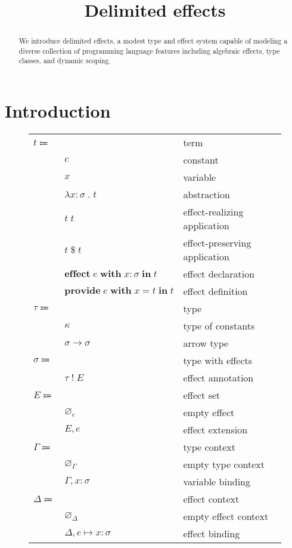 \documentclass[12pt]{article}
\title{Delimited effects}
\date{}
\newcommand\eterm{t}
\newcommand\econst{c}
\newcommand\evar{x}
\newcommand\eabs[2]{\lambda #1 \; . \; #2} %
\newcommand\eapp[2]{#1 \; #2}
\newcommand\eappx[2]{#1 \; \$ \; #2}
\newcommand\eeffect[4]{\textbf{effect} \; #1 \; \textbf{with} \; \tanno{#2}{#3} \; \textbf{in} \; #4}
\newcommand\eprovide[4]{\textbf{provide} \; #1 \; \textbf{with} \; #2 = #3 \; \textbf{in} \; #4}
\newcommand\ttype{\tau}
\newcommand\tconst{\kappa}
\newcommand\tarrow[2]{#1 \rightarrow #2} %
\newcommand\tanno[2]{#1 : #2} %
\newcommand\tx{\sigma}
\newcommand\twithx[2]{#1 \; ! \; #2} %
\newcommand\xeffect{e}
\newcommand\xeffects{E}
\newcommand\xempty{\varnothing_{\xeffect}}
\newcommand\xextend[2]{#1, #2}
\newcommand\ccontext{\Gamma}
\newcommand\cempty{\varnothing_{\ccontext}}
\newcommand\cextend[2]{#1, #2}
\newcommand\dcontext{\Delta}
\newcommand\dempty{\varnothing_{\dcontext}}
\newcommand\dextend[2]{#1, #2}
\newcommand\deffect[3]{#1 \mapsto \tanno{#2}{#3}}
\begin{document}
  \maketitle

  \begin{abstract}
    We introduce delimited effects, a modest type and effect system capable of modeling a diverse collection of programming language features including algebraic effects, type classes, and dynamic scoping.
  \end{abstract}

  \section{Introduction}

  \begin{figure}
    \begin{mdframed}
      \begin{center}
        \begin{tabular}{l l l}
          $\eterm \Coloneqq $ & & term \\
          & $\econst$ & constant \\
          & $\evar$ & variable \\
          & $\eabs{\tanno{\evar}{\tx}}{\eterm}$ & abstraction \\
          & $\eapp{\eterm}{\eterm}$ & effect-realizing application \\
          & $\eappx{\eterm}{\eterm}$ & effect-preserving application \\
          & $\eeffect{\xeffect}{\evar}{\tx}{\eterm}$ & effect declaration \\
          & $\eprovide{\xeffect}{\evar}{\eterm}{\eterm}$ & effect definition \\
          $\ttype \Coloneqq$ & & type \\
          & $\tconst$ & type of constants \\
          & $\tarrow{\tx}{\tx}$ & arrow type \\
          $\tx \Coloneqq$ & & type with effects \\
          & $\twithx{\ttype}{\xeffects}$ & effect annotation \\
          $\xeffects \Coloneqq$ & & effect set \\
          & $\xempty$ & empty effect \\
          & $\xextend{\xeffects}{\xeffect}$ & effect extension \\
          $\ccontext \Coloneqq$ & & type context \\
          & $\cempty$ & empty type context \\
          & $\cextend{\ccontext}{\tanno{\evar}{\tx}}$ & variable binding \\
          $\dcontext \Coloneqq$ & & effect context \\
          & $\dempty$ & empty effect context \\
          & $\dextend{\dcontext}{\deffect{\xeffect}{\evar}{\tx}}$ & effect binding \\
        \end{tabular}
      \end{center}


\end{mdframed}
\end{figure}
\end{document}
